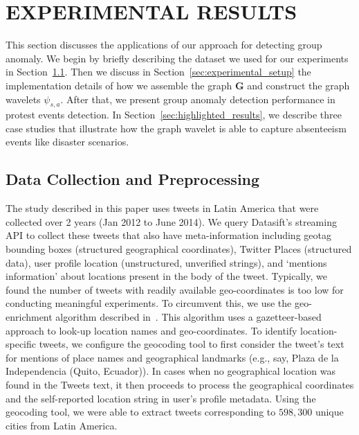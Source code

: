 \documentclass[conference]{IEEEtran}
\begin{document}
\section{EXPERIMENTAL RESULTS}
\label{sec:experiment}
This section discusses the applications of our approach for detecting group anomaly.
We begin by briefly describing the dataset we used for our experiments in Section~\ref{sec:data_collection}.
Then we discuss in Section~\ref{sec:experimental_setup} the implementation details of how we assemble the graph $\mathbf{G}$ and construct the graph wavelets $\psi_{s,a}$.
After that, we present group anomaly detection performance in protest events detection. In Section~\ref{sec:highlighted_results}, we describe three case studies that illustrate how the graph wavelet is able to capture absenteeism events like disaster scenarios.


\subsection{Data Collection and Preprocessing}
\label{sec:data_collection}
The study described in this paper uses tweets in Latin America that were collected over 2 years (Jan 2012 to June 2014).
We query Datasift's streaming API to collect these tweets that also have meta-information including geotag bounding boxes (structured geographical coordinates), Twitter Places (structured data), user profile location (unstructured, unverified strings), and `mentions information' about locations present in the body of the tweet.
Typically, we found the number of tweets with readily available geo-coordinates is too low for conducting meaningful experiments.
To circumvent this, we use the geo-enrichment algorithm described in~\cite{ramakrishnan2014beating}.
This algorithm uses a gazetteer-based approach to look-up location names and geo-coordinates.
To identify  location-specific tweets, we configure the geocoding tool to first consider the tweet's text for mentions of place names and geographical landmarks (e.g., say, Plaza de la Independencia (Quito, Ecuador)).
In cases when no geographical location was found in the Tweets text, it then proceeds to process the geographical coordinates and the self-reported location string in user's profile metadata.
Using the geocoding tool, we were able to extract tweets corresponding to $598,300$ unique cities from Latin America.

\end{document}
